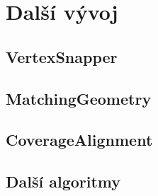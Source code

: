 \chapter{Další vývoj}
\label{9-vyvoj}

\section{VertexSnapper}




\section{MatchingGeometry}



\section{CoverageAlignment}



\section{Další algoritmy}

